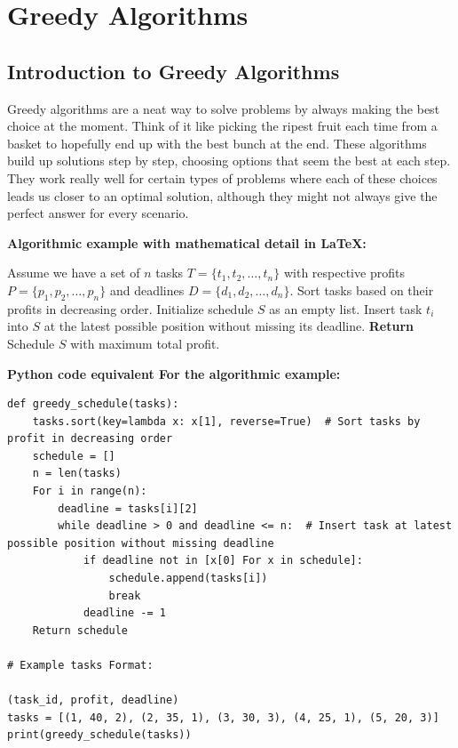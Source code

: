 \documentclass[12pt]{book} %
\begin{document}
\chapter{Greedy Algorithms}

\section{Introduction to Greedy Algorithms}
Greedy algorithms are a neat way to solve problems by always making the best choice at the moment. Think of it like picking the ripest fruit each time from a basket to hopefully end up with the best bunch at the end. These algorithms build up solutions step by step, choosing options that seem the best at each step. They work really well for certain types of problems where each of these choices leads us closer to an optimal solution, although they might not always give the perfect answer for every scenario.

\textbf{Algorithmic example with mathematical detail in LaTeX:}
\FloatBarrier

\begin{algorithm}
\caption{Greedy Algorithm Example}
\begin{algorithmic}[1]
\State Assume we have a set of $n$ tasks $T = \{t_1, t_2, \ldots, t_n\}$ with respective profits $P = \{p_1, p_2, \ldots, p_n\}$ and deadlines $D = \{d_1, d_2, \ldots, d_n\}$.
\State Sort tasks based on their profits in decreasing order.
\State Initialize schedule $S$ as an empty list.
    \State Insert task $t_i$ into $S$ at the latest possible position without missing its deadline.
\EndFor
\State \textbf{Return} Schedule $S$ with maximum total profit.
\end{algorithmic}
\end{algorithm}
\FloatBarrier

\textbf{Python code equivalent For the algorithmic example:}
\FloatBarrier
\begin{lstlisting}
def greedy_schedule(tasks):
    tasks.sort(key=lambda x: x[1], reverse=True)  # Sort tasks by profit in decreasing order
    schedule = []
    n = len(tasks)
    For i in range(n):
        deadline = tasks[i][2]
        while deadline > 0 and deadline <= n:  # Insert task at latest possible position without missing deadline
            if deadline not in [x[0] For x in schedule]:
                schedule.append(tasks[i])
                break
            deadline -= 1
    Return schedule

# Example tasks Format: 

(task_id, profit, deadline)
tasks = [(1, 40, 2), (2, 35, 1), (3, 30, 3), (4, 25, 1), (5, 20, 3)]
print(greedy_schedule(tasks))
\end{lstlisting}
\FloatBarrier
\end{document}
